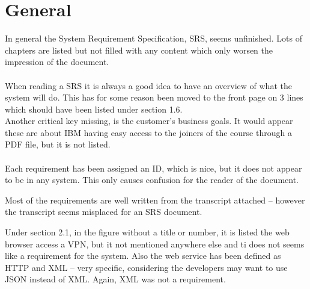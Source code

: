 \documentclass[Main]{subfiles}
\begin{document}
\section{General}
In general the System Requirement Specification, SRS, seems unfinished.
Lots of chapters are listed but not filled with any content which only worsen the impression of the document.
\\
\\
When reading a SRS it is always a good idea to have an overview of what the system will do.
This has for some reason been moved to the front page on 3 lines which should have been listed under section 1.6.
\\
Another critical key missing, is the customer's business goals.
It would appear these are about IBM having easy access to the joiners of the course through a PDF file, but it is not listed.
\\
\\
Each requirement has been assigned an ID, which is nice, but it does not appear to be in any system.
This only causes confusion for the reader of the document.

Most of the requirements are well written from the transcript attached -- however the transcript seems misplaced for an SRS document.

Under section 2.1, in the figure without a title or number, it is listed the web browser access a VPN, but it not mentioned anywhere else and ti does not seems like a requirement for the system.
Also the web service has been defined as HTTP and XML -- very specific, considering the developers may want to use JSON instead of XML.
Again, XML was not a requirement.
\end{document}
